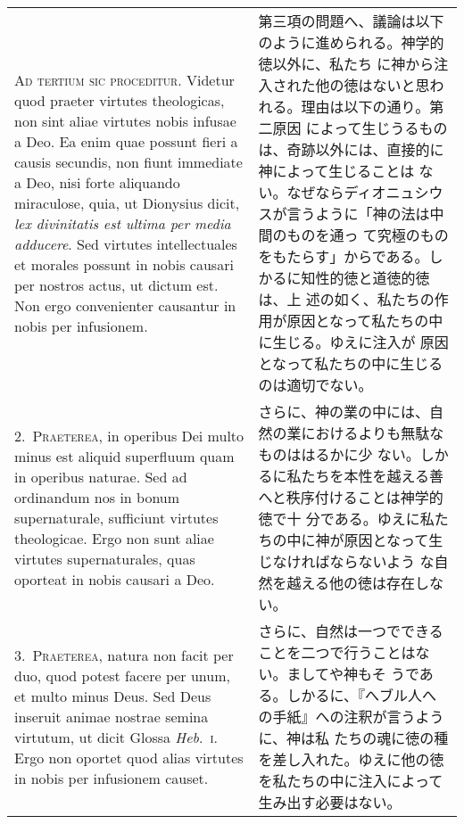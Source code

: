 \documentclass[10pt]{jsarticle}
\begin{document}
\begin{longtable}{p{21em}p{21em}}
{\scshape Ad tertium sic proceditur}. Videtur quod praeter virtutes
theologicas, non sint aliae virtutes nobis infusae a Deo. Ea enim quae
possunt fieri a causis secundis, non fiunt immediate a Deo, nisi forte
aliquando miraculose, quia, ut Dionysius dicit, {\itshape lex
divinitatis est ultima per media adducere}. Sed virtutes
intellectuales et morales possunt in nobis causari per nostros actus,
ut dictum est. Non ergo convenienter causantur in nobis per
infusionem.

&

 第三項の問題へ、議論は以下のように進められる。神学的徳以外に、私たち
 に神から注入された他の徳はないと思われる。理由は以下の通り。第二原因
 によって生じうるものは、奇跡以外には、直接的に神によって生じることは
 ない。なぜならディオニュシウスが言うように「神の法は中間のものを通っ
 て究極のものをもたらす」からである。しかるに知性的徳と道徳的徳は、上
 述の如く、私たちの作用が原因となって私たちの中に生じる。ゆえに注入が
 原因となって私たちの中に生じるのは適切でない。
 
\\



2.~{\scshape Praeterea}, in operibus Dei multo minus est aliquid
superfluum quam in operibus naturae. Sed ad ordinandum nos in bonum
supernaturale, sufficiunt virtutes theologicae. Ergo non sunt aliae
virtutes supernaturales, quas oporteat in nobis causari a Deo.

&

 さらに、神の業の中には、自然の業におけるよりも無駄なものははるかに少
 ない。しかるに私たちを本性を越える善へと秩序付けることは神学的徳で十
 分である。ゆえに私たちの中に神が原因となって生じなければならないよう
 な自然を越える他の徳は存在しない。
 
\\



3.~{\scshape Praeterea}, natura non facit per duo, quod potest facere
per unum, et multo minus Deus. Sed Deus inseruit animae nostrae semina
virtutum, ut dicit Glossa {\itshape Heb}.~{\scshape i}. Ergo non
oportet quod alias virtutes in nobis per infusionem causet.

&

 さらに、自然は一つでできることを二つで行うことはない。ましてや神もそ
 うである。しかるに、『へブル人への手紙』への注釈が言うように、神は私
 たちの魂に徳の種を差し入れた。ゆえに他の徳を私たちの中に注入によって
 生み出す必要はない。
 

\end{longtable}
\end{document}
